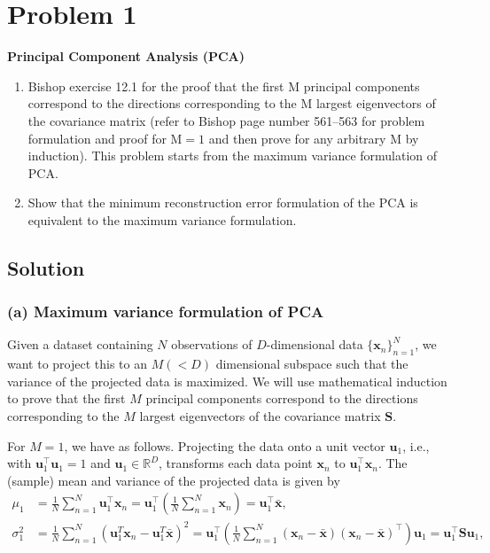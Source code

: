 \section*{Problem 1}

\textbf{Principal Component Analysis (PCA)}

\begin{enumerate}[label= (\alph*), noitemsep, topsep=0pt]
    \item Bishop exercise 12.1 for the proof that the first M principal components correspond to the directions corresponding to the M largest eigenvectors of the covariance matrix (refer to Bishop page number 561--563 for problem formulation and proof for \( \mathrm{M}=1 \) and then prove for any arbitrary M by induction).
          This problem starts from the maximum variance formulation of PCA.\@

    \item Show that the minimum reconstruction error formulation of the PCA is equivalent to the maximum variance formulation.
\end{enumerate}

\subsection*{Solution}

\subsubsection*{(a) Maximum variance formulation of PCA}

Given a dataset containing \( N \) observations of \( D \)-dimensional data \( {\{ \mathbf{x}_n \}}_{n=1}^{N} \), we want to project this to an \( M (< D) \) dimensional subspace such that the variance of the projected data is maximized.
We will use mathematical induction to prove that the first \( M \) principal components correspond to the directions corresponding to the \( M \) largest eigenvectors of the covariance matrix \( \mathbf{S} \).

For \( M = 1 \), we have as follows.
Projecting the data onto a unit vector \( \mathbf{u}_1 \), i.e., with \( \mathbf{u}_1^\top \mathbf{u}_1 = 1 \) and \( \mathbf{u}_1 \in \mathbb{R}^D \), transforms each data point \( \mathbf{x}_n \) to \( \mathbf{u}_1^\top \mathbf{x}_n \).
The (sample) mean and variance of the projected data is given by
\begin{align*}
    \mu_1
     & =
    \frac{1}{N} \sum_{n=1}^{N} \mathbf{u}_1^\top \mathbf{x}_n
    =
    \mathbf{u}_1^\top \left( \frac{1}{N} \sum_{n=1}^{N} \mathbf{x}_n \right)
    =
    \mathbf{u}_1^\top \bar{\mathbf{x}},
    \\
    \sigma_1^2
     & =
    \frac{1}{N} \sum_{n=1}^{N} {( \mathbf{u}_1^T \mathbf{x}_n - \mathbf{u}_1^T \bar{\mathbf{x}} )}^2
    =
    \mathbf{u}_1^\top \left( \frac{1}{N} \sum_{n=1}^{N} {(\mathbf{x}_n - \bar{\mathbf{x}})}{(\mathbf{x}_n - \bar{\mathbf{x}})^\top} \right) \mathbf{u}_1
    =
    \mathbf{u}_1^\top \mathbf{S} \mathbf{u}_1,
\end{align*}

